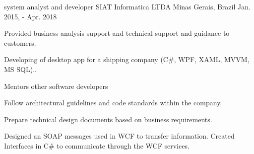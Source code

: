 \begin{cventries}
  \cventry
    {system analyst and developer} %
    {SIAT Informatica LTDA} %
    {Minas Gerais, Brazil} %
    {Jan. 2015, - Apr. 2018} %
    {
      \begin{cvitems} %
        \item {Provided business analysis support and technical support and guidance to customers.}
        \item {Developing of desktop app for a shipping company (C\#, WPF, XAML, MVVM, MS SQL)..}
        \item {Mentors other software developers}
        \item {Follow architectural guidelines and code standards within the company.}
        \item {Prepare technical design documents based on business requirements.}
        \item {Designed an SOAP messages used in WCF to transfer information. Created Interfaces in C\# to communicate through the WCF services.}
      \end{cvitems}
    }

\end{cventries}
